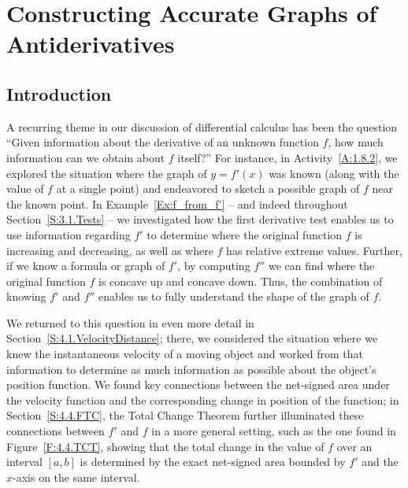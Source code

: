 \section{Constructing Accurate Graphs of Antiderivatives} \label{S:5.1.AntiDGraphs}

\vspace*{-14 pt}

\subsection*{Introduction}

A recurring theme in our discussion of differential calculus has been the question ``Given information about the derivative of an unknown function $f$, how much information can we obtain about $f$ itself?''  For instance, in Activity~\ref{A:1.8.2}, we explored the situation where the graph of $y = f'(x)$ was known (along with the value of $f$ at a single point) and endeavored to sketch a possible graph of $f$ near the known point.  In Example~\ref{Ex:f_from_f'} -- and indeed throughout Section~\ref{S:3.1.Tests} -- we investigated how the first derivative test enables us to use information regarding $f'$ to determine where the original function $f$ is increasing and decreasing, as well as where $f$ has relative extreme values.  Further, if we know a formula or graph of $f'$, by computing $f''$ we can find where the original function $f$ is concave up and concave down.  Thus, the combination of knowing $f'$ and $f''$ enables us to fully understand the shape of the graph of $f$.

We returned to this question in even more detail in Section~\ref{S:4.1.VelocityDistance}; there, we considered the situation where we knew the instantaneous velocity of a moving object and worked from that information to determine as much information as possible about the object's position function.  We found key connections between the net-signed area under the velocity function and the corresponding change in position of the function; in Section~\ref{S:4.4.FTC}, the Total Change Theorem further illuminated these connections between $f'$ and $f$ in a more general setting, such as the one found in Figure~\ref{F:4.4.TCT}, showing that the total change in the value of $f$ over an interval $[a,b]$ is determined by the exact net-signed area bounded by $f'$ and the $x$-axis on the same interval.

